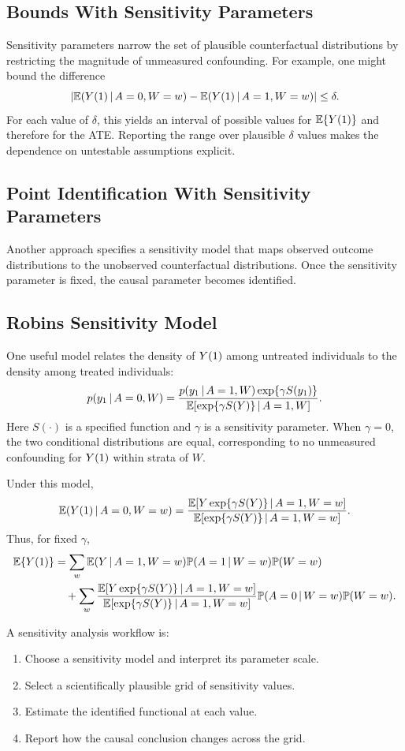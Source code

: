 \subsection{Bounds With Sensitivity Parameters}

Sensitivity parameters narrow the set of plausible counterfactual distributions
by restricting the magnitude of unmeasured confounding. For example, one might
bound the difference
\[
  \left|
  \mathbb{E}(Y(1)\,\vert\, A=0,W=w)-\mathbb{E}(Y(1)\,\vert\, A=1,W=w)
  \right|
  \le \delta.
\]
For each value of $\delta$, this yields an interval of possible values for
$\mathbb{E}\{Y(1)\}$ and therefore for the ATE. Reporting the range over plausible
$\delta$ values makes the dependence on untestable assumptions explicit.

\subsection{Point Identification With Sensitivity Parameters}

Another approach specifies a sensitivity model that maps observed outcome
distributions to the unobserved counterfactual distributions. Once the
sensitivity parameter is fixed, the causal parameter becomes identified.

\subsection{Robins Sensitivity Model}

One useful model relates the density of $Y(1)$ among untreated individuals to
the density among treated individuals:
\[
  p(y_1\,\vert\, A=0,W)
  =
  \frac{
  p(y_1\,\vert\, A=1,W)\exp\{\gamma S(y_1)\}
  }{
  \mathbb{E}[\exp\{\gamma S(Y)\}\,\vert\, A=1,W]
  }.
\]
Here $S(\cdot)$ is a specified function and $\gamma$ is a sensitivity parameter.
When $\gamma=0$, the two conditional distributions are equal, corresponding to
no unmeasured confounding for $Y(1)$ within strata of $W$.

Under this model,
\[
  \mathbb{E}(Y(1)\,\vert\, A=0,W=w)
  =
  \frac{
  \mathbb{E}[Y\exp\{\gamma S(Y)\}\,\vert\, A=1,W=w]
  }{
  \mathbb{E}[\exp\{\gamma S(Y)\}\,\vert\, A=1,W=w]
  }.
\]
Thus, for fixed $\gamma$,
\[
\begin{aligned}
  \mathbb{E}\{Y(1)\}
  &=
  \sum_w \mathbb{E}(Y\,\vert\, A=1,W=w)\mathbb{P}(A=1\,\vert\, W=w)\mathbb{P}(W=w)\\
  &\quad+
  \sum_w
  \frac{
  \mathbb{E}[Y\exp\{\gamma S(Y)\}\,\vert\, A=1,W=w]
  }{
  \mathbb{E}[\exp\{\gamma S(Y)\}\,\vert\, A=1,W=w]
  }
  \mathbb{P}(A=0\,\vert\, W=w)\mathbb{P}(W=w).
\end{aligned}
\]

\begin{estimationbox}
A sensitivity analysis workflow is:
\begin{enumerate}
  \item Choose a sensitivity model and interpret its parameter scale.
  \item Select a scientifically plausible grid of sensitivity values.
  \item Estimate the identified functional at each value.
  \item Report how the causal conclusion changes across the grid.
\end{enumerate}
\end{estimationbox}
